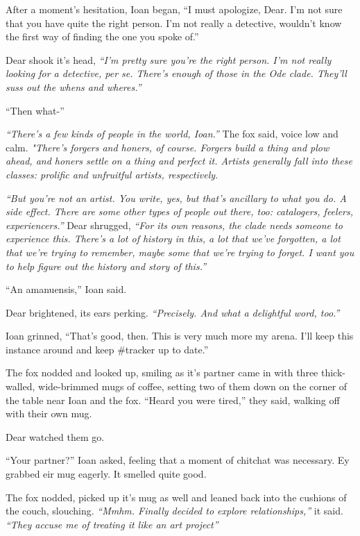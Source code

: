 After a moment's hesitation, Ioan began, ``I must apologize, Dear. I'm not sure that you have quite the right person. I'm not really a detective, wouldn't know the first way of finding the one you spoke of.''

Dear shook it's head, \emph{``I'm pretty sure you're the right person. I'm not really looking for a detective, per se. There's enough of those in the Ode clade. They'll suss out the whens and wheres.''}

``Then what-''

\emph{``There's a few kinds of people in the world, Ioan.''} The fox said, voice low and calm. \emph{"There's forgers and honers, of course. Forgers build a thing and plow ahead, and honers settle on a thing and perfect it. Artists generally fall into these classes: prolific and unfruitful artists, respectively.}

\emph{``But you're not an artist. You write, yes, but that's ancillary to what you do. A side effect. There are some other types of people out there, too: catalogers, feelers, experiencers.''} Dear shrugged, \emph{``For its own reasons, the clade needs someone to experience this. There's a lot of history in this, a lot that we've forgotten, a lot that we're trying to remember, maybe some that we're trying to forget. I want you to help figure out the history and story of this.''}

``An amanuensis,'' Ioan said.

Dear brightened, its ears perking. \emph{``Precisely. And what a delightful word, too.''}

Ioan grinned, ``That's good, then. This is very much more my arena. I'll keep this instance around and keep \#tracker up to date.''

The fox nodded and looked up, smiling as it's partner came in with three thick-walled, wide-brimmed mugs of coffee, setting two of them down on the corner of the table near Ioan and the fox. ``Heard you were tired,'' they said, walking off with their own mug.

Dear watched them go.

``Your partner?'' Ioan asked, feeling that a moment of chitchat was necessary. Ey grabbed eir mug eagerly. It smelled quite good.

The fox nodded, picked up it's mug as well and leaned back into the cushions of the couch, slouching. \emph{``Mmhm. Finally decided to explore relationships,''} it said. \emph{``They accuse me of treating it like an art project''}

